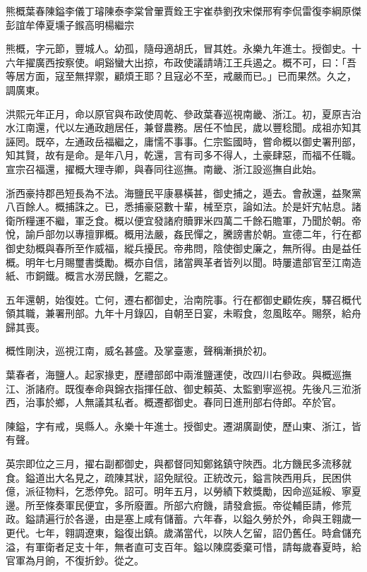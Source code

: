 
\begin{pinyinscope}
熊概葉春陳鎰李儀丁璿陳泰李棠曾翬賈銓王宇崔恭劉孜宋傑邢宥李侃雷復李綱原傑彭誼牟俸夏壎子鍭高明楊繼宗

熊概，字元節，豐城人。幼孤，隨母適胡氏，冒其姓。永樂九年進士。授御史。十六年擢廣西按察使。峒谿蠻大出掠，布政使議請靖江王兵遏之。概不可，曰：「吾等居方面，寇至無捍禦，顧煩王耶？且寇必不至，戒嚴而已。」已而果然。久之，調廣東。

洪熙元年正月，命以原官與布政使周乾、參政葉春巡視南畿、浙江。初，夏原吉治水江南還，代以左通政趙居任，兼督農務。居任不恤民，歲以豐稔聞。成祖亦知其誣罔。既卒，左通政岳福繼之，庸懦不事事。仁宗監國時，嘗命概以御史署刑部，知其賢，故有是命。是年八月，乾還，言有司多不得人，土豪肆惡，而福不任職。宣宗召福還，擢概大理寺卿，與春同往巡撫。南畿、浙江設巡撫自此始。

浙西豪持郡邑短長為不法。海鹽民平康暴橫甚，御史捕之，遁去。會赦還，益聚黨八百餘人。概捕誅之。已，悉捕豪惡數十輩，械至京，論如法。於是奸宄帖息。諸衛所糧運不繼，軍乏食。概以便宜發諸府贖罪米四萬二千餘石贍軍，乃聞於朝。帝悅，諭戶部勿以專擅罪概。概用法嚴，姦民憚之，騰謗書於朝。宣德二年，行在都御史劾概與春所至作威福，縱兵擾民。帝弗問，陰使御史廉之，無所得。由是益任概。明年七月賜璽書獎勵。概亦自信，諸當興革者皆列以聞。時屢遣部官至江南造紙、市銅鐵。概言水澇民饑，乞罷之。

五年還朝，始復姓。亡何，遷右都御史，治南院事。行在都御史顧佐疾，驛召概代領其職，兼署刑部。九年十月錄囚，自朝至日宴，未暇食，忽風眩卒。賜祭，給舟歸其喪。

概性剛決，巡視江南，威名甚盛。及掌臺憲，聲稱漸損於初。

葉春者，海鹽人。起家掾吏，歷禮部郎中兩淮鹽運使，改四川右參政。與概巡撫江、浙諸府。既復奉命與錦衣指揮任啟、御史賴英、太監劉寧巡視。先後凡三涖浙西，治事於鄉，人無議其私者。概遷都御史。春同日進刑部右侍郎。卒於官。

陳鎰，字有戒，吳縣人。永樂十年進士。授御史。遷湖廣副使，歷山東、浙江，皆有聲。

英宗即位之三月，擢右副都御史，與都督同知鄭銘鎮守陜西。北方饑民多流移就食。鎰道出大名見之，疏陳其狀，詔免賦役。正統改元，鎰言陜西用兵，民困供億，派征物料，乞悉停免。詔可。明年五月，以勞績下敕獎勵，因命巡延綏、寧夏邊。所至條奏軍民便宜，多所廢置。所部六府饑，請發倉振。帝從輔臣請，修荒政。鎰請遍行於各邊，由是塞上咸有儲蓄。六年春，以鎰久勞於外，命與王翱歲一更代。七年，翱調遼東，鎰復出鎮。歲滿當代，以陜人乞留，詔仍舊任。時倉儲充溢，有軍衛者足支十年，無者直可支百年。鎰以陳腐委棄可惜，請每歲春夏時，給官軍為月餉，不復折鈔。從之。


\end{pinyinscope}
